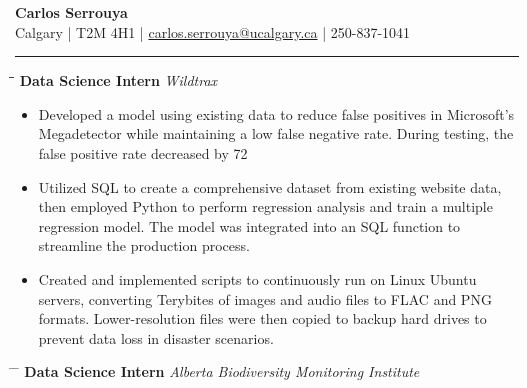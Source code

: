 \documentclass[a4paper,11pt]{article}
\def\jobh{\hspace{-1ex}}
\def\locationh{\hspace{7cm}}
\def\dateh{\hspace{10cm}}
\def\titlev{\vspace{0cm}}
\def\sectionv{\vspace{0cm}}
\def\subsectionv{\vspace{-5ex}}
\def\postpointsv{\vspace{0cm}}
\begin{document}
\begin{center}
    {\LARGE \textbf{Carlos Serrouya}} \\
    Calgary | T2M 4H1 | \href{mailto:carlos.serrouya@ucalgary.ca}{carlos.serrouya@ucalgary.ca} | 250-837-1041 \\
\end{center}

\titlev

\noindent {}
\vspace{-2.35em} %
\par\noindent
\rule{\textwidth}{0.4pt}

\sectionv

\noindent \begin{tabbing}
    \jobh \= \locationh \= \dateh \= \kill
    \> \textbf{Data Science Intern} \> \textit{Wildtrax} \\
\end{tabbing}

\begin{itemize}[leftmargin=.5cm, itemsep=.1cm, before=\subsectionv, after=\postpointsv]
	\item Developed a model using existing data to reduce false positives in Microsoft's Megadetector while maintaining a low false negative rate. During testing, the false positive rate decreased by 72%
	\item Utilized SQL to create a comprehensive dataset from existing website data, then employed Python to perform regression analysis and train a multiple regression model. The model was integrated into an SQL function to streamline the production process.
	\item Created and implemented scripts to continuously run on Linux Ubuntu servers, converting Terybites of images and audio files to FLAC and PNG formats. Lower-resolution files were then copied to backup hard drives to prevent data loss in disaster scenarios.
\end{itemize}

\vspace{0.5cm}

\begin{tabbing}
    \hspace{7cm} \= \hspace{10cm} \= \kill
    \textbf{Data Science Intern} \> \textit{Alberta Biodiversity Monitoring Institute} \\
\end{tabbing}
\end{document}
